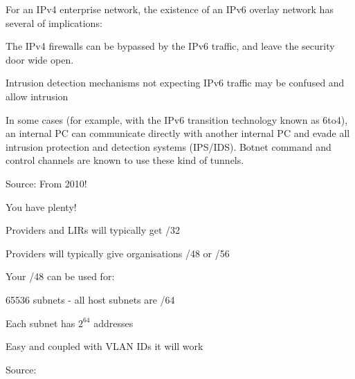 \documentclass[20pt,landscape,a4paper,footrule]{foils}
\begin{document}
\begin{list1}
\item For an IPv4 enterprise network, the existence of an IPv6 overlay network has several of implications:
\begin{list2}
\item The IPv4 firewalls can be bypassed by the IPv6 traffic, and leave the security door wide open.
\item Intrusion detection mechanisms not expecting IPv6 traffic may be confused and allow intrusion
\item In some cases (for example, with the IPv6 transition technology known as 6to4), an internal PC can communicate directly with another internal PC and evade all intrusion protection and detection systems (IPS/IDS). Botnet command and control channels are known to use these kind of tunnels.
\end{list2}
\end{list1}

Source: From 2010!\\
{\footnotesize{}}



\begin{list1}
\item You have plenty!
\item Providers and LIRs will typically get /32
\item Providers will typically give organisations /48 or /56
\item Your /48 can be used for:
\begin{list2}
\item 65536 subnets - all host subnets are /64
\item Each subnet has $2^{64}$ addresses
\end{list2}
\end{list1}



\centerline{Easy and coupled with VLAN IDs it will work \smiley}

Source:
{\footnotesize {}}



\end{document}

